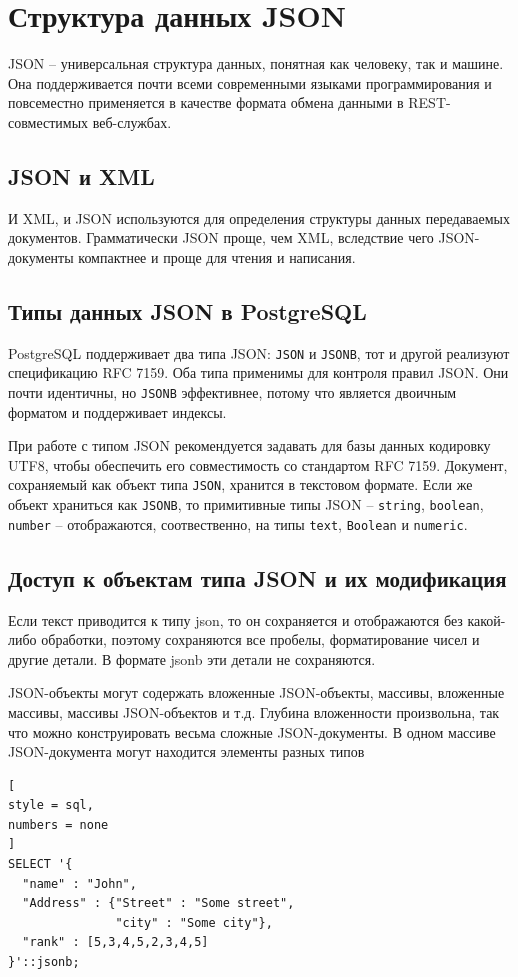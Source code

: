\documentclass[%
	11pt,
	a4paper,
	utf8,
		]{article}
\begin{document}
\section{Структура данных JSON}

JSON -- универсальная структура данных, понятная как человеку, так и машине. Она поддерживается почти всеми современными языками программирования и повсеместно применяется в качестве формата обмена данными в REST-совместимых веб-службах.

\subsection{JSON и XML}

И XML, и JSON используются для определения структуры данных передаваемых документов. Грамматически JSON проще, чем XML, вследствие чего JSON-документы компактнее и проще для чтения и написания. 

\subsection{Типы данных JSON в PostgreSQL}

PostgreSQL поддерживает два типа JSON: \texttt{JSON} и \texttt{JSONB}, тот и другой реализуют спецификацию RFC 7159. Оба типа применимы для контроля правил JSON. Они почти идентичны, но \texttt{JSONB} эффективнее, потому что является двоичным форматом и поддерживает индексы.

При работе с типом JSON рекомендуется задавать для базы данных кодировку UTF8, чтобы обеспечить его совместимость со стандартом RFC 7159. Документ, сохраняемый как объект типа \texttt{JSON}, хранится в текстовом формате. Если же объект храниться как \texttt{JSONB}, то примитивные типы JSON -- \texttt{string}, \texttt{boolean}, \texttt{number} -- отображаются, соотвественно, на типы \texttt{text}, \texttt{Boolean} и \texttt{numeric}.

\subsection{Доступ к объектам типа JSON и их модификация}

Если текст приводится к типу json, то он сохраняется и отображаются без какой-либо обработки, поэтому сохраняются все пробелы, форматирование чисел и другие детали. В формате jsonb эти детали не сохраняются.

JSON-объекты могут содержать вложенные JSON-объекты, массивы, вложенные массивы, массивы JSON-объектов и т.д. Глубина вложенности произвольна, так что можно конструировать весьма сложные JSON-документы. В одном массиве JSON-документа могут находится элементы разных типов
\begin{lstlisting}[
style = sql,
numbers = none
]
SELECT '{
  "name" : "John",
  "Address" : {"Street" : "Some street",
               "city" : "Some city"},
  "rank" : [5,3,4,5,2,3,4,5]
}'::jsonb;
\end{lstlisting}
\end{document}
